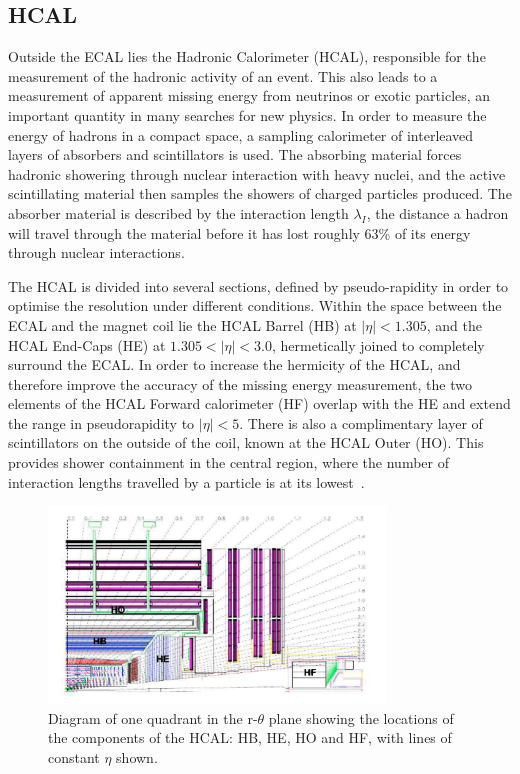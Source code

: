 \subsection{HCAL}

Outside the ECAL lies the Hadronic Calorimeter (HCAL),  responsible for the measurement of the hadronic activity of an event. This also leads to a measurement of apparent missing energy from neutrinos or exotic particles, an important quantity in many searches for new physics. In order to measure the energy of hadrons in a compact space, a sampling calorimeter of interleaved layers of absorbers and scintillators is used. The absorbing material forces hadronic showering through nuclear interaction with heavy nuclei, and the active scintillating material then samples the showers of charged particles produced. The absorber material is described by the interaction length $\lambda_{I}$, the distance a hadron will travel through the material before it has lost roughly 63\% of its energy through nuclear interactions.

 The HCAL is divided into several sections, defined by pseudo-rapidity in order to optimise the resolution under different conditions. Within the space between the ECAL and the magnet coil lie the HCAL Barrel (HB) at $|\eta| < 1.305$, and the HCAL End-Caps (HE) at $1.305 < |\eta| < 3.0$, hermetically joined to completely surround the ECAL. In order to increase the hermicity of the HCAL, and therefore improve the accuracy of the missing energy measurement, the two elements of the HCAL Forward calorimeter (HF) overlap with the HE and extend the range in pseudorapidity to $|\eta|<5$. There is also a complimentary layer of scintillators on the outside of the coil, known at the HCAL Outer (HO).  This provides shower containment in the central region, where the number of interaction lengths travelled by a particle is at its lowest~\cite{HCALTDR}.


\begin{figure}
\centering
\includegraphics[width=0.8\textwidth]{Figures/Detector/HCAL}
\caption{Diagram of one quadrant in the r-$\theta$ plane showing the locations of the components of the HCAL: HB, HE, HO and HF, with lines of constant $\eta$ shown.}
\label{fig:HCAL}
\end{figure}


